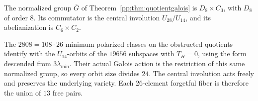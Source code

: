 \begin{proposition}
\label{pp:prop:minimumpolarizedgalois}
The normalized group $\overline G$ of
Theorem~\ref{pp:thm:quotientgalois} is $D_8\times C_3$, with $D_8$
of order $8$. Its commutator is the central involution $U_{28}/U_{14}$,
and its abelianization is $C_6\times C_2$.

The $2808=108\cdot26$ minimum polarized classes on the obstructed
quotients identify with the $U_{14}$-orbits of the $19656$ subspaces
with $T_H=0$, using the form descended from $3\lambda_{\min}$.
Their actual Galois action is the restriction of this same normalized
group, so every orbit size divides $24$. The central involution acts
freely and preserves the underlying variety. Each $26$-element
forgetful fiber is therefore the union of $13$ free pairs.
\end{proposition}
